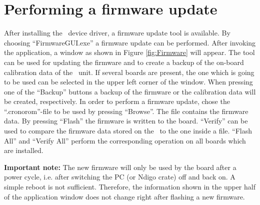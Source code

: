 \section{Performing a firmware update}

After installing the \deviceName\ device driver, a firmware update tool is available.
 By choosing ``FirmwareGUI.exe'' a firmware update can be performed. 
 After invoking the application, a window as shown in Figure \ref{fig:Firmware} will appear. 
 The tool can be used for updating the firmware and to create a backup of the on-board calibration data of the \deviceName\ unit. 
 If several boards are present, the one which is going to be used can be selected in the upper left corner of the window. 
 When pressing one of the ``Backup'' buttons a backup of the firmware or the calibration data will be created, respectively. 
 In order to perform a firmware update, chose the ``.cronorom''-file to be used by pressing ``Browse''. 
 The file contains the firmware data. By pressing ``Flash'' the firmware is written to the board. 
 ``Verify'' can be used to compare the firmware data stored on the \deviceName\ to the one inside a file.
 ``Flash All'' and ``Verify All'' perform the corresponding operation on all boards which are installed.\par

\begin{figure*}[ht]
    \begin{center}
        \caption{\label{fig:Firmware}The firmware update and calibration data backup tool as provided with the \deviceName\ device driver.}
    \end{center}
\end{figure*}

\textbf{Important note:} The new firmware will only be used by the board after a power cycle, i.e. after switching the PC (or Ndigo crate) off and back on. 
A simple reboot is not sufficient. Therefore, the information shown in the upper half of the application window does not change right after flashing a new firmware.

